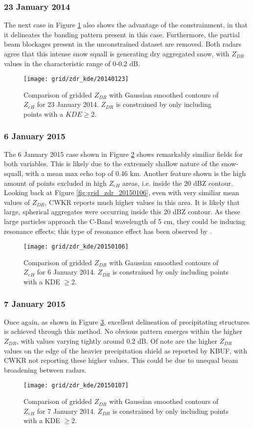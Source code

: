 \subsubsection{23 January 2014}
The next case in Figure \ref{fig:grid_zdr_kde_20140123} also shows the advantage of the constrainment, in that it delineates the banding pattern present in this case. Furthermore, the partial beam blockages present in the unconstrained dataset are removed. Both radars agree that this intense snow
squall is generating dry aggregated snow, with $Z_{DR}$ values in the characteristic range of 0-0.2 dB.
\begin{figure}[H]
\texttt{[image: grid/zdr\_kde/20140123]}
\caption{Comparison of gridded $Z_{DR}$ with Gaussian smoothed contours of $Z_{eH}$ for 23 January 2014. $Z_{DR}$ is constrained by only including points with a
$KDE \geq 2$.} 
\label{fig:grid_zdr_kde_20140123}
\end{figure}
\subsubsection{6 January 2015}
The 6 January 2015 case shown in Figure \ref{fig:grid_zdr_kde_20150106} shows remarkably similiar fields for both variables. This is likely due to the extremely shallow nature of the snow-squall, with a mean max echo top of 0.46 km. Another feature shown is the high amount of points excluded in high $Z_{eH}$ areas,  i.e. inside the 20 dBZ contour. Looking back at Figure \ref{fig:grid_zdr_20150106}, even with very similiar mean values of $Z_{DR}$, CWKR reports much higher values in this area. It is likely that large, spherical aggregates were occurring inside this 20 dBZ contour. As these large particles approach the C-Band wavelength of 5 cm, they could be inducing resonance effects; this type of resonance effect has been observed by \citet{Hassan2017}.
\begin{figure}[H]
\texttt{[image: grid/zdr\_kde/20150106]}
\caption{Comparison of gridded $Z_{DR}$ with Gaussian smoothed contours of $Z_{eH}$ for 6 January 2014. $Z_{DR}$ is constrained by only including points with a
KDE $\geq 2$.} 
\label{fig:grid_zdr_kde_20150106}
\end{figure}
\subsubsection{7 January 2015}
Once again, as shown in Figure \ref{fig:grid_zdr_kde_20150107}, excellent delineation of precipitating structures is achieved through this method. No obvious pattern emerges within the higher $Z_{DR}$, with values varying tightly around 0.2 dB. Of note are the higher $Z_{DR}$ values on the edge of the heavier precipitation shield as reported by KBUF, with CWKR not reporting these higher values. This could be due to unequal beam broadening between radars.
\begin{figure}[H]
\texttt{[image: grid/zdr\_kde/20150107]}
\caption{Comparison of gridded $Z_{DR}$ with Gaussian smoothed contours of $Z_{eH}$ for 7 January 2014. $Z_{DR}$ is constrained by only including points with a
KDE $\geq 2$.} 
\label{fig:grid_zdr_kde_20150107}
\end{figure}

